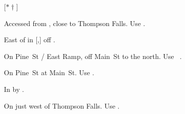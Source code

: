 
[$\ast\dagger$]

\begin{LocationList}

Accessed from , close to Thompson Falls.
Use  .

East of  in [,] off  .



On Pine~St / East Ramp, off  Main~St to the north.
Use~ .

On Pine~St at  Main~St.
Use  .

\Location{\TruckStop \Gas \Rest}
In  by  .

On  just west of Thompson Falls.
Use  .

\end{LocationList}
